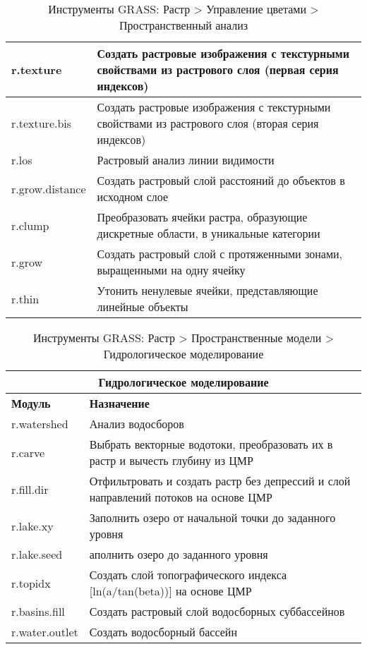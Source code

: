 {\begin{table}[H]
\begin{tabular}{|p{4cm}|p{11cm}|}
  \hline r.texture & Создать растровые изображения с текстурными
  свойствами из растрового слоя (первая серия индексов) \\
  \hline r.texture.bis & Создать растровые изображения с текстурными
  свойствами из растрового слоя (вторая серия индексов) \\
  \hline r.los & Растровый анализ линии видимости \\
  \hline r.grow.distance & Создать растровый слой расстояний до объектов
  в исходном слое \\
  \hline r.clump & Преобразовать ячейки растра, образующие дискретные
  области, в уникальные категории \\
  \hline r.grow & Создать растровый слой с протяженными зонами,
  выращенными на одну ячейку \\
  \hline r.thin & Утонить ненулевые ячейки, представляющие линейные
  объекты \\
\hline
\end{tabular}
\caption{Инструменты GRASS: Растр > Управление цветами > Пространственный анализ}
\end{table}}

{\renewcommand{\arraystretch}{0.7}
\begin{table}[H]
\centering
 \begin{tabular}{|p{4cm}|p{11cm}|}
  \hline \multicolumn{2}{|c|}{\textbf{Гидрологическое моделирование}} \\
  \hline \textbf{Модуль} & \textbf{Назначение} \\
  \hline r.watershed & Анализ водосборов \\
  \hline r.carve & Выбрать векторные водотоки, преобразовать их в растр
  и вычесть глубину из ЦМР \\
  \hline r.fill.dir & Отфильтровать и создать растр без депрессий и слой
  направлений потоков на основе ЦМР \\
  \hline r.lake.xy & Заполнить озеро от начальной точки до заданного
  уровня \\
  \hline r.lake.seed & аполнить озеро до заданного уровня \\
  \hline r.topidx & Создать слой топографического индекса [ln(a/tan(beta))]
  на основе ЦМР \\
  \hline r.basins.fill & Создать растровый слой водосборных суббассейнов \\
  \hline r.water.outlet & Создать водосборный бассейн \\
\hline
\end{tabular}
\caption{Инструменты GRASS: Растр > Пространственные модели > Гидрологическое моделирование}
\end{table}}

